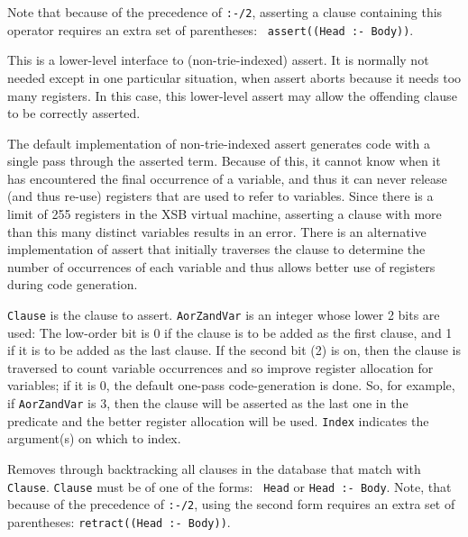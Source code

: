 \begin{description}
Note that because of the precedence of {\tt :-/2}, asserting a clause
containing this operator requires an extra set of parentheses: {\tt
  assert((Head :- Body))}.

This is a lower-level interface to (non-trie-indexed) assert.  It is
normally not needed except in one particular situation, when assert
aborts because it needs too many registers.  In this case, this
lower-level assert may allow the offending clause to be correctly
asserted.

The default implementation of non-trie-indexed assert generates code
with a single pass through the asserted term.  Because of this, it
cannot know when it has encountered the final occurrence of a
variable, and thus it can never release (and thus re-use) registers
that are used to refer to variables.  Since there is a limit of 255
registers in the XSB virtual machine, asserting a clause with more
than this many distinct variables results in an error.  There is an
alternative implementation of assert that initially traverses the
clause to determine the number of occurrences of each variable and
thus allows better use of registers during code generation.

{\tt Clause} is the clause to assert. {\tt AorZandVar} is an integer
whose lower 2 bits are used: The low-order bit is 0 if the clause is
to be added as the first clause, and 1 if it is to be added as the
last clause. If the second bit (2) is on, then the clause is traversed
to count variable occurrences and so improve register allocation for
variables; if it is 0, the default one-pass code-generation is done.
So, for example, if {\tt AorZandVar} is 3, then the clause will be
asserted as the last one in the predicate and the better register
allocation will be used.  {\tt Index} indicates the argument(s) on
which to index.

%
Removes through backtracking all clauses in the database that match
with {\tt Clause}.  {\tt Clause} must be of one of the forms: {\tt
  Head} or {\tt Head :- Body}.  Note, that because of the precedence
of {\tt :-/2}, using the second form requires an extra set of
parentheses: {\tt retract((Head :- Body))}.  


\end{description}
